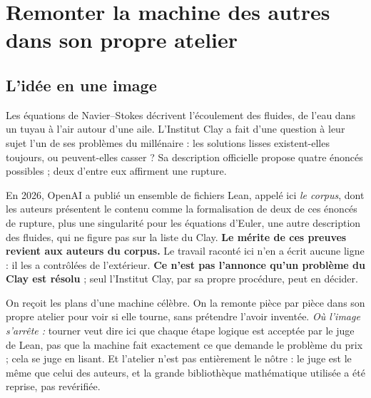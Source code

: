 \chapter[Remonter la machine des autres]{Remonter la machine des autres dans son propre atelier}


\section*{L'idée en une image}

Les équations de Navier--Stokes décrivent l'écoulement des fluides, de l'eau dans un tuyau à
l'air autour d'une aile. L'Institut Clay a fait d'une question à leur sujet l'un de ses
\og problèmes du millénaire\fg{} : les solutions lisses existent-elles toujours, ou peuvent-elles
\og casser\fg{} ? Sa description officielle propose quatre énoncés possibles ; deux d'entre eux
affirment une rupture.

En 2026, OpenAI a publié un ensemble de fichiers Lean, appelé ici \emph{le corpus}, dont les
auteurs présentent le contenu comme la formalisation de deux de ces énoncés de rupture, plus une
singularité pour les équations d'Euler, une autre description des fluides, qui ne figure pas sur la
liste du Clay. \textbf{Le mérite de
ces preuves revient aux auteurs du corpus.} Le travail raconté ici n'en a écrit aucune ligne : il
les a contrôlées de l'extérieur. \textbf{Ce n'est pas l'annonce qu'un problème du Clay est
résolu} ; seul l'Institut Clay, par sa propre procédure, peut en décider.

\begin{analogie}
On reçoit les plans d'une machine célèbre. On la remonte pièce par pièce dans son propre atelier
pour voir si elle tourne, sans prétendre l'avoir inventée. \emph{Où l'image s'arrête :}
\og tourner\fg{} veut dire ici que chaque étape logique est acceptée par le juge de Lean, pas que
la machine fait exactement ce que demande le problème du prix ; cela se juge en lisant. Et
l'atelier n'est pas entièrement le nôtre : le juge est le même que celui des auteurs, et la
grande bibliothèque mathématique utilisée a été reprise, pas revérifiée.
\end{analogie}

